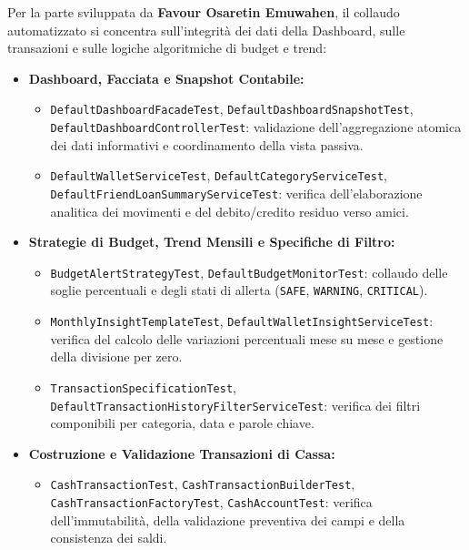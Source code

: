 \documentclass[11pt,a4paper,openright]{report}
\begin{document}
Per la parte sviluppata da \textbf{Favour Osaretin Emuwahen}, il collaudo automatizzato si concentra sull'integrità dei dati della Dashboard, sulle transazioni e sulle logiche algoritmiche di budget e trend:
\begin{itemize}
  \item \textbf{Dashboard, Facciata e Snapshot Contabile:}
  \begin{itemize}
    \item \texttt{DefaultDashboardFacadeTest}, \texttt{DefaultDashboardSnapshotTest}, \\ \texttt{DefaultDashboardControllerTest}: validazione dell'aggregazione atomica dei dati informativi e coordinamento della vista passiva.
    \item \texttt{DefaultWalletServiceTest}, \texttt{DefaultCategoryServiceTest}, \\ \texttt{DefaultFriendLoanSummaryServiceTest}: verifica dell'elaborazione analitica dei movimenti e del debito/credito residuo verso amici.
  \end{itemize}
  \item \textbf{Strategie di Budget, Trend Mensili e Specifiche di Filtro:}
  \begin{itemize}
    \item \texttt{BudgetAlertStrategyTest}, \texttt{DefaultBudgetMonitorTest}: collaudo delle soglie percentuali e degli stati di allerta (\texttt{SAFE}, \texttt{WARNING}, \texttt{CRITICAL}).
    \item \texttt{MonthlyInsightTemplateTest}, \texttt{DefaultWalletInsightServiceTest}: verifica del calcolo delle variazioni percentuali mese su mese e gestione della divisione per zero.
    \item \texttt{TransactionSpecificationTest}, \texttt{DefaultTransactionHistoryFilterServiceTest}: verifica dei filtri componibili per categoria, data e parole chiave.
  \end{itemize}
  \item \textbf{Costruzione e Validazione Transazioni di Cassa:}
  \begin{itemize}
    \item \texttt{CashTransactionTest}, \texttt{CashTransactionBuilderTest}, \texttt{CashTransactionFactoryTest}, \texttt{CashAccountTest}: verifica dell'immutabilità, della validazione preventiva dei campi e della consistenza dei saldi.
  \end{itemize}
\end{itemize}
\end{document}
